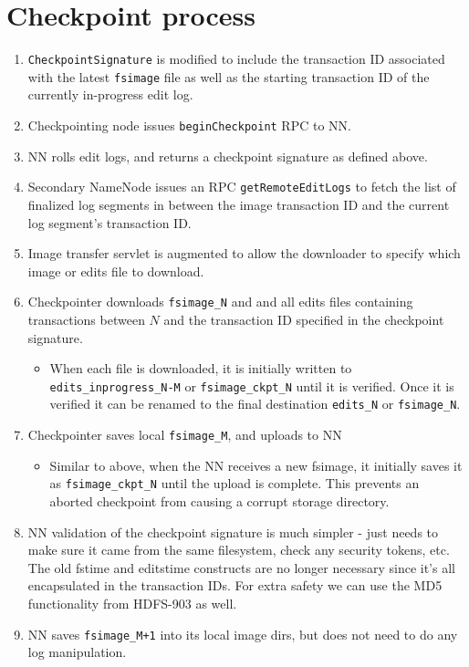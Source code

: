\documentclass{article}
\begin{document}
\section{Checkpoint process}
\label{2nn-checkpoint}
\begin{enumerate}
\item {\tt CheckpointSignature} is modified to include the transaction ID associated with the latest {\tt fsimage} file as well as the starting transaction ID of the currently in-progress edit log.
\item Checkpointing node issues {\tt beginCheckpoint} RPC to NN.
\item NN rolls edit logs, and returns a checkpoint signature as defined above.
\item Secondary NameNode issues an RPC {\tt getRemoteEditLogs} to fetch the list of finalized log segments in between the image transaction ID and the current log segment's transaction ID.
\item Image transfer servlet is augmented to allow the downloader to specify which image or edits file to download.
\item Checkpointer downloads {\tt fsimage\_N} and and all edits files containing transactions between $N$ and the transaction ID specified in the checkpoint signature.
  \begin{itemize}
  \item When each file is downloaded, it is initially written to {\tt edits\_inprogress\_N-M} or {\tt fsimage\_ckpt\_N} until it is verified. Once it is verified it can be renamed to the final destination {\tt edits\_N} or {\tt fsimage\_N}.
  \end{itemize}
 
\item Checkpointer saves local {\tt fsimage\_M}, and uploads to NN
  \begin{itemize}
  \item Similar to above, when the NN receives a new fsimage, it initially saves it as {\tt fsimage\_ckpt\_N} until the upload is complete. This prevents an aborted checkpoint from causing a corrupt storage directory.
  \end{itemize}
\item NN validation of the checkpoint signature is much simpler - just needs to make sure it came from the same filesystem, check any security tokens, etc. The old fstime and editstime constructs are no longer necessary since it's all encapsulated in the transaction IDs. For extra safety we can use the MD5 functionality from HDFS-903 as well.
\item NN saves {\tt fsimage\_M+1} into its local image dirs, but does not need to do any log manipulation.
\end{enumerate}
\end{document}

